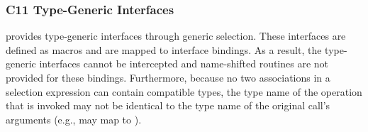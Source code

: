 \subsubsection{C11 Type-Generic Interfaces}
\label{sec:pshmem_c11_type_generic_interfaces}
\openshmem provides type-generic interfaces through \Cstd[11]
generic selection. These interfaces are defined as macros
and are mapped to \Cstd interface bindings. As a result, the
\Cstd[11] type-generic interfaces cannot be intercepted and
name-shifted  routines are not provided for these
bindings. Furthermore, because no two associations in a \Cstd[11]
 selection expression can contain compatible types,
the type name of the \Cstd operation that is invoked may not be
identical to the type name of the original call's arguments (e.g.,
 may map to ).
